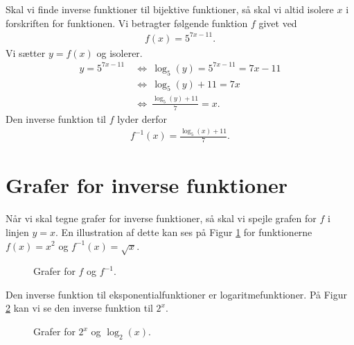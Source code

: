 \begin{exa}
	Skal vi finde inverse funktioner til bijektive funktioner, så skal vi altid isolere $x$ i forskriften for 
	funktionen. Vi betragter følgende funktion $f$ givet ved
	\begin{align*}
		f(x) = 5^{7x-11}.
	\end{align*}
	Vi sætter $y = f(x)$ og isolerer.
	\begin{align*}
		y = 5^{7x-11} \ &\Leftrightarrow \ \log_5(y) = 5^{7x-11} = 7x-11 \\
		&\Leftrightarrow	 \ \log_5(y)+11 = 7x \\
		&\Leftrightarrow	 \ \frac{\log_5(y)+11}{7} = x.
	\end{align*}
	Den inverse funktion til $f$ lyder derfor
	\begin{align*}
		f^{-1}(x) = \frac{\log_5(x) + 11}{7}.
	\end{align*}
\end{exa}

\section*{Grafer for inverse funktioner}

Når vi skal tegne grafer for inverse funktioner, så skal vi spejle grafen for $f$ i linjen $y = x$. En illustration af dette kan ses på Figur \ref{fig:invgraf} for funktionerne $f(x) = x^2$ og $f^{-1}(x) = \sqrt{x}$.

\begin{figure}[H]
	\centering
	\caption{Grafer for $f$ og $f^{-1}$.}
	\label{fig:invgraf}
\end{figure}

Den inverse funktion til eksponentialfunktioner er logaritmefunktioner. På Figur \ref{fig:invgraflog} kan vi se 
den inverse funktion til $2^x$. 
\begin{figure}[H]
	\centering
	\caption{Grafer for $2^x$ og $\log_{2}(x)$.}
	\label{fig:invgraflog}
\end{figure}

